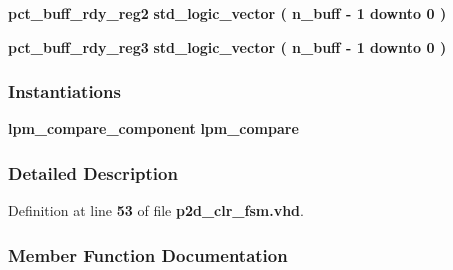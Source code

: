 \begin{DoxyCompactItemize}
\item 
{\bf pct\+\_\+buff\+\_\+rdy\+\_\+reg2} {\bfseries \textcolor{comment}{std\+\_\+logic\+\_\+vector}\textcolor{vhdlchar}{ }\textcolor{vhdlchar}{(}\textcolor{vhdlchar}{ }\textcolor{vhdlchar}{ }\textcolor{vhdlchar}{ }\textcolor{vhdlchar}{ }{\bfseries {\bf n\+\_\+buff}} \textcolor{vhdlchar}{-\/}\textcolor{vhdlchar}{ } \textcolor{vhdldigit}{1} \textcolor{vhdlchar}{ }\textcolor{keywordflow}{downto}\textcolor{vhdlchar}{ }\textcolor{vhdlchar}{ } \textcolor{vhdldigit}{0} \textcolor{vhdlchar}{ }\textcolor{vhdlchar}{)}\textcolor{vhdlchar}{ }} 
\item 
{\bf pct\+\_\+buff\+\_\+rdy\+\_\+reg3} {\bfseries \textcolor{comment}{std\+\_\+logic\+\_\+vector}\textcolor{vhdlchar}{ }\textcolor{vhdlchar}{(}\textcolor{vhdlchar}{ }\textcolor{vhdlchar}{ }\textcolor{vhdlchar}{ }\textcolor{vhdlchar}{ }{\bfseries {\bf n\+\_\+buff}} \textcolor{vhdlchar}{-\/}\textcolor{vhdlchar}{ } \textcolor{vhdldigit}{1} \textcolor{vhdlchar}{ }\textcolor{keywordflow}{downto}\textcolor{vhdlchar}{ }\textcolor{vhdlchar}{ } \textcolor{vhdldigit}{0} \textcolor{vhdlchar}{ }\textcolor{vhdlchar}{)}\textcolor{vhdlchar}{ }} 
\end{DoxyCompactItemize}
\subsubsection*{Instantiations}
 \begin{DoxyCompactItemize}
\item 
{\bf lpm\+\_\+compare\+\_\+component}  {\bfseries lpm\+\_\+compare}   
\end{DoxyCompactItemize}


\subsubsection{Detailed Description}


Definition at line {\bf 53} of file {\bf p2d\+\_\+clr\+\_\+fsm.\+vhd}.



\subsubsection{Member Function Documentation}
